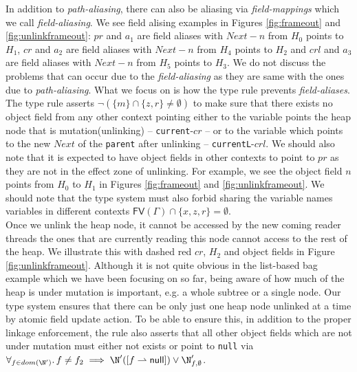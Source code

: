 In addition to \textit{path-aliasing}, there can also be aliasing via \textit{field-mappings} which we call \textit{field-aliasing}. We see field alising examples in Figures \ref{fig:frameout} and \ref{fig:unlinkframeout}: $pr$ and $a_1$ are field aliases with $Next-n$ from $H_0$ points to $H_1$, $cr$ and $a_2$ are field aliases with $Next-n$ from $H_4$ points to $H_2$  and $crl$ and $a_3$ are field aliases with $Next-n$ from $H_5$ points to $H_3$. We do not discuss the problems that can occur due to the \textit{field-aliasing} as they are same with the ones due to \textit{path-aliasing}. What we focus on is how the type rule prevents \textit{field-aliases}. The type rule asserts $\lnot(\{m\} \cap \{z,r\} \neq \emptyset)$ to make sure that there exists no object field from any other context pointing either to the variable points the heap node that is mutation(unlinking) -- \texttt{current}-$cr$ -- or to the variable which points to the new $Next$ of the \texttt{parent} after unlinking -- \texttt{currentL}-$crl$. We should also note that it is expected to have object fields in other contexts to point to $pr$ as they are not in the effect zone of unlinking. For example, we see the object field $n$ points from $H_0$ to  $H_1$ in Figures \ref{fig:frameout} and \ref{fig:unlinkframeout}.
We should note that the type system must also forbid sharing the variable names variables in different contexts $\textsf{FV}(\Gamma) \cap \{x,z,r\} = \emptyset$.\\
Once we unlink the heap node, it cannot be accessed by the new coming reader threads the ones that are currently reading this node cannot access to the rest of the heap. We illustrate this with dashed red $cr$, $H_2$ and object fields in Figure \ref{fig:unlinkframeout}.
Although it is not quite obvious in the list-based bag example which we have been focusing on so far, being aware of how much of the heap is under mutation is important, e.g. a whole subtree or a single node. Our type system ensures that there can be only just one heap node unlinked at a time by atomic field update action. To be able to ensure this, in addition to the proper linkage enforcement, the rule also asserts that all other object fields which are not under mutation must either not exists or point to \texttt{null} via $\forall_{f\in dom(\N')} \ldotp f\neq f_2 \implies \N'([f\rightharpoonup \textsf{null}]) \lor \N'_{f,\emptyset}$.
